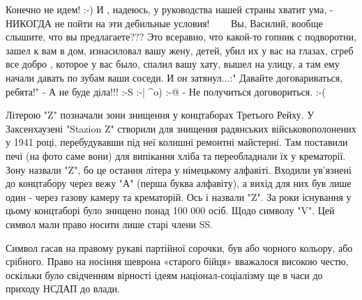 Конечно не идем! :-) И , надеюсь, у руководства нашей страны хватит ума, -
НИКОГДА не пойти на эти дебильные условия! 🙏 🙏 🙏 Вы, Василий, вообще
слышите, что вы предлагаете??? Это всеравно, что какой-то гопник с подворотни,
зашел к вам в дом, изнасиловал вашу жену, детей, убил их у вас на глазах, сгреб
все добро , которое у вас было, спалил вашу хату, вышел на улицу, а там ему
начали давать по зубам ваши соседи. И он затянул...:" Давайте договариваться,
ребята!" - А не буде діла!!! :-S :-| ^o) :-@ - Не получиться договориться. :-(

Літерою "Z" позначали зони знищення у концтаборах Третього Рейху. У
Заксенхаузені "Stazion Z" створили для знищення радянських військовополонених у
1941 році, перебудувавши під неї колишні ремонтні майстерні. Там поставили печі
(на фото саме вони) для випікання хліба та переобладнали їх у крематорії. Зону
назвали "Z", бо це остання літера у німецькому алфавіті. Входили ув'язнені до
концтабору через вежу "А" (перша буква алфавіту), а вихід для них був лише один
- через газову камеру та крематорій. Ось і назвали "Z". За роки існування у
цьому концтаборі було знищено понад 100 000 осіб.  Щодо символу "V". Цей символ
мали право носити лише старі члени SS.

Символ гасав на правому рукаві партійної сорочки, був або чорного кольору, або
срібного. Право на носіння шеврона «старого бійця» вважалося високою честю,
оскільки було свідченням вірності ідеям націонал-соціалізму ще в часи до
приходу НСДАП до влади.

